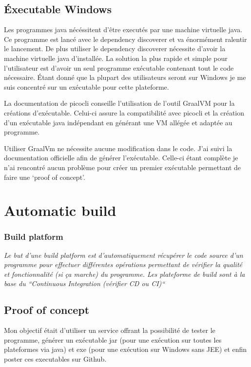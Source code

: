 \documentclass[french,a4paper,12pt]{report}
\begin{document}
\subsection{Éxecutable Windows}

Les programmes java nécéssitent d’être executés par une machine virtuelle java. Ce programme est lancé avec le dependency discoverer et va énormément ralentir le lancement. De plus utiliser le dependency discoverer nécessite d’avoir la machine virtuelle java d’installée. La solution la plus rapide et simple pour l’utilisateur est d’avoir un seul programme exécutable contenant tout le code nécessaire. Étant donné que la plupart des utilisateurs seront sur Windows je me suis concentré sur un exécutable pour cette plateforme.

La documentation de picocli conseille l’utilisation de l’outil GraalVM pour la créations d’exécutable. Celui-ci assure la compatibilité avec picocli et la création d’un exécutable java indépendant en générant une VM allégée et adaptée au programme. 

Utiliser GraalVm ne nécessite aucune modification dans le code. J’ai suivi la documentation officielle afin de générer l’exécutable. Celle-ci étant complète je n’ai rencontré aucun problème pour créer un premier exécutable permettant de faire une ‘proof of concept’.


\section{Automatic build}

\subsubsection{Build platform}

\textit{Le but d’une build platform est d’automatiquement récupérer le code source d’un programme pour effectuer différentes opérations permettant de vérifier la qualité et fonctionnalité (si ça marche) du programme. Les plateforme de build sont à la base du “Continuous Integration (vérifier CD ou CI)“}

\subsection{Proof of concept}

Mon objectif était d'utiliser un service offrant la possibilité de tester le programme, générer un exécutable jar (pour une exécution sur toutes les plateformes via java) et exe (pour une exécution sur Windows sans JEE) et enfin poster ces executables sur Github. 
\end{document}
